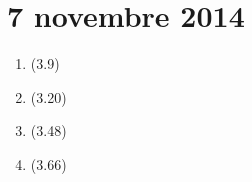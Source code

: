 \section{7 novembre 2014}

\begin{enumerate}
    \item (3.9)
    \item (3.20)
    \item (3.48)
    \item (3.66)
\end{enumerate}
